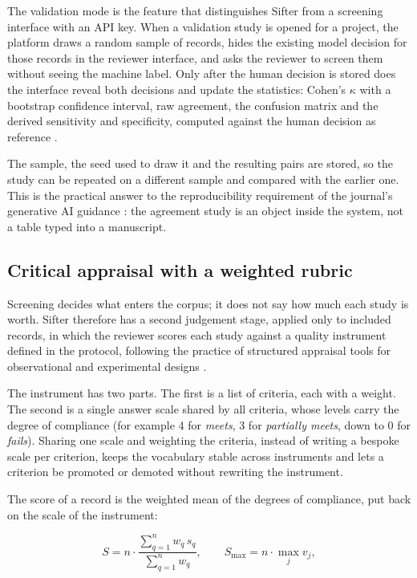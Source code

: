 The validation mode is the feature that distinguishes Sifter from a screening
interface with an API key. When a validation study is opened for a project,
the platform draws a random sample of records, hides the existing model
decision for those records in the reviewer interface, and asks the reviewer to
screen them without seeing the machine label. Only after the human decision is
stored does the interface reveal both decisions and update the statistics:
Cohen's $\kappa$ with a bootstrap confidence interval, raw agreement, the
confusion matrix and the derived sensitivity and specificity, computed against
the human decision as reference \autocite{Cohen_1960,Landis_1977}.

The sample, the seed used to draw it and the resulting pairs are stored, so
the study can be repeated on a different sample and compared with the earlier
one. This is the practical answer to the reproducibility requirement of the
journal's generative AI guidance \autocite{Farotimi_2025}: the agreement study
is an object inside the system, not a table typed into a manuscript.

\subsection{Critical appraisal with a weighted rubric}\label{sec:quality}

Screening decides what enters the corpus; it does not say how much each study
is worth. Sifter therefore has a second judgement stage, applied only to
included records, in which the reviewer scores each study against a quality
instrument defined in the protocol, following the practice of structured
appraisal tools for observational and experimental designs
\autocite{NOS_2000,CASP_2023}.

The instrument has two parts. The first is a list of criteria, each with a
weight. The second is a single answer scale shared by all criteria, whose
levels carry the degree of compliance (for example 4 for \emph{meets}, 3 for
\emph{partially meets}, down to 0 for \emph{fails}). Sharing one scale and
weighting the criteria, instead of writing a bespoke scale per criterion, keeps
the vocabulary stable across instruments and lets a criterion be promoted or
demoted without rewriting the instrument.

The score of a record is the weighted mean of the degrees of compliance, put
back on the scale of the instrument:

\begin{equation}
S = n \cdot \frac{\sum_{q=1}^{n} w_q\, s_q}{\sum_{q=1}^{n} w_q},
\qquad
S_{\max} = n \cdot \max_j v_j,
\label{eq:quality}
\end{equation}

